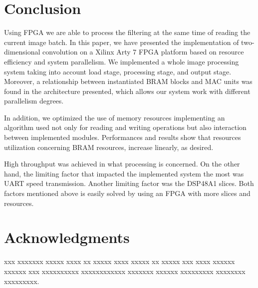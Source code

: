 \documentclass[conference,compsoc]{IEEEtran}
\begin{document}




\section{Conclusion}\label{sec:conclusion}
Using FPGA we are able to process the filtering at the same time of reading the
current image batch. In this paper, we have presented the implementation of
two-dimensional convolution on a Xilinx Arty 7 FPGA platform based on resource
efficiency and system parallelism. We implemented a whole image processing
system taking into account load stage, processing stage, and output stage.
Moreover, a relationship between instantiated BRAM blocks and MAC units was
found in the architecture presented, which allows our system work with different
parallelism degrees.

In addition, we optimized the use of memory resources implementing an algorithm
used not only for reading and writing operations but also interaction between
implemented modules. Performances and results show that resources utilization
concerning BRAM resources, increase linearly, as desired.

High throughput was achieved in what processing is concerned. On the other hand,
the limiting factor that impacted the implemented system the most was UART speed
transmission. Another limiting factor was the DSP48A1 slices. Both factors
mentioned above is easily solved by using an FPGA with more slices and
resources.






\ifCLASSOPTIONcompsoc
  \section*{Acknowledgments}
xxx xxxxxxx xxxxx xxxx xx xxxxx xxxx xxxxx xx xxxxx xxx xxxx xxxxxx xxxxxx xxx
xxxxxxxxxx xxxxxxxxxxxx xxxxxxx xxxxxx xxxxxxxxx xxxxxxxx xxxxxxxxx.
\end{document}
